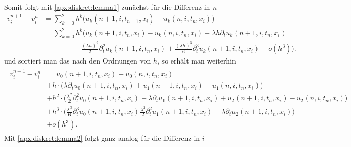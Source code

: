 Somit folgt mit \eqref{apx:diskret:lemma1} zunächst für die Differenz in $n$
{\begin{align*}
v^{n+1}_i - v^{n}_i
&= \sum_{k=0}^2 h^k \bigl( u_k(n+1, i, t_{n+1}, x_i) - u_k(n, i, t_n, x_i) \bigr)\\
&= \sum_{k=0}^2 h^k \Biggl( u_k(n+1, i, t_n, x_i) - u_k(n, i, t_n, x_i) + \lambda h \partial_t u_k(n+1, i, t_n, x_i)\\
&\qquad \qquad + \frac{(\lambda h)^2}{2} \partial^2_t u_k(n+1, i, t_n, x_i) + \frac{(\lambda h)^3}{6} \partial^3_t u_k(n+1, i, t_n, x_i) + o(h^3) \Biggr).
\end{align*}}
und sortiert man das nach den Ordnungen von $h$, so erhält man weiterhin
{\footnotesize\begin{align}\label{eq:transport:diskret:diff1}
\begin{split}
v^{n+1}_i - v^{n}_i
&= u_0(n+1, i, t_n, x_i) - u_0(n, i, t_n, x_i)\\
&+ h \cdot \bigl( \lambda \partial_t u_0(n+1, i, t_n, x_i) + u_1(n+1, i, t_n, x_i) - u_1(n, i, t_n, x_i) \bigr)\\
&+ h^2 \cdot \Biggl( \frac{\lambda^2}{2} \partial^2_t u_0(n+1, i, t_n, x_i) + \lambda \partial_t u_1(n+1, i, t_n, x_i) + u_2(n+1, i, t_n, x_i) - u_2(n, i, t_n, x_i) \Biggr)\\
&+ h^3 \cdot \Biggl( \frac{\lambda^3}{6} \partial^3_t u_0(n+1, i, t_n, x_i) \frac{\lambda^2}{2} \partial^2_t u_1(n+1, i, t_n, x_i) + \lambda \partial_t u_2(n+1, i, t_n, x_i)\Biggr)\\
&+ o(h^3).
\end{split}
\end{align}}
Mit \eqref{apx:diskret:lemma2} folgt ganz analog für die Differenz in $i$

